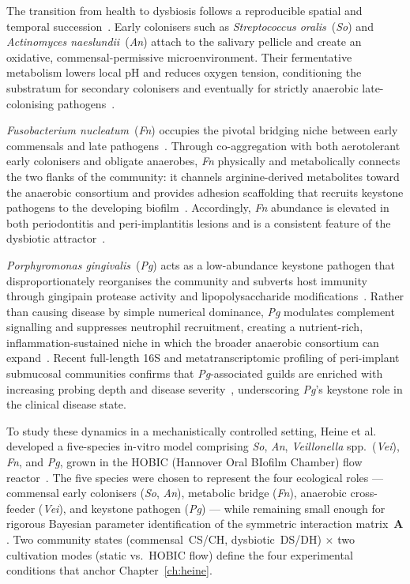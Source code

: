The transition from health to dysbiosis follows a reproducible spatial and temporal
succession~\cite{Kolenbrander2006FnBridge}.
Early colonisers such as \textit{Streptococcus oralis}~(\textit{So}) and
\textit{Actinomyces naeslundii}~(\textit{An}) attach to the salivary pellicle and
create an oxidative, commensal-permissive microenvironment.
Their fermentative metabolism lowers local pH and reduces oxygen tension, conditioning
the substratum for secondary colonisers and eventually for strictly anaerobic
late-colonising pathogens~\cite{Lamont2018Periodontal}.

\textit{Fusobacterium nucleatum}~(\textit{Fn}) occupies the pivotal bridging niche
between early commensals and late pathogens~\cite{Signat2011Fn, Kolenbrander2006FnBridge}.
Through co-aggregation with both aerotolerant early colonisers and obligate anaerobes,
\textit{Fn} physically and metabolically connects the two flanks of the community:
it channels arginine-derived metabolites toward the anaerobic consortium and provides
adhesion scaffolding that recruits keystone pathogens to the developing
biofilm~\cite{Sakanaka2022FnArginine, Jiang2025FnReview}.
Accordingly, \textit{Fn} abundance is elevated in both periodontitis and
peri-implantitis lesions and is a consistent feature of the dysbiotic
attractor~\cite{Signat2011Fn}.

\textit{Porphyromonas gingivalis}~(\textit{Pg}) acts as a low-abundance keystone
pathogen that disproportionately reorganises the community and subverts host immunity
through gingipain protease activity and lipopolysaccharide
modifications~\cite{Hajishengallis2014Polymicrobial, Mysak2014Pg}.
Rather than causing disease by simple numerical dominance, \textit{Pg} modulates
complement signalling and suppresses neutrophil recruitment, creating a
nutrient-rich, inflammation-sustained niche in which the broader anaerobic consortium
can expand~\cite{Hajishengallis2012Dysbiosis, Lamont2018Periodontal}.
Recent full-length 16S and metatranscriptomic profiling of peri-implant submucosal
communities confirms that \textit{Pg}-associated guilds are enriched with increasing
probing depth and disease severity~\cite{joshi2025}, underscoring \textit{Pg}'s
keystone role in the clinical disease state.

To study these dynamics in a mechanistically controlled setting, Heine et al.~\cite{Heine2025PeriImplant}
developed a five-species in-vitro model comprising \textit{So}, \textit{An},
\textit{Veillonella} spp.~(\textit{Vei}), \textit{Fn}, and \textit{Pg}, grown in
the HOBIC (Hannover Oral BIofilm Chamber) flow reactor~\cite{Kommerein2018HOBIC}.
The five species were chosen to represent the four ecological roles
--- commensal early colonisers (\textit{So}, \textit{An}), metabolic bridge (\textit{Fn}),
anaerobic cross-feeder (\textit{Vei}), and keystone pathogen (\textit{Pg}) ---
while remaining small enough for rigorous Bayesian parameter
identification of the symmetric interaction matrix~$\mathbf{A}$.
Two community states (commensal~CS/CH, dysbiotic~DS/DH) $\times$ two cultivation
modes (static vs.\ HOBIC flow) define the four experimental conditions that anchor
Chapter~\ref{ch:heine}.

